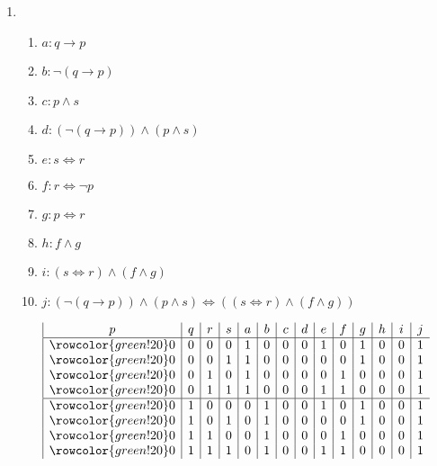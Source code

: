 \documentclass{article}
\begin{document}
\begin{enumerate}[label=(\alph*)]
\begin{enumerate}[label=\roman*.]
        \item 
        \begin{enumerate}[label={}]         
            \item $a: q\rightarrow{}p$         
            \item $b: \lnot{}(q\rightarrow{}p)$         
            \item $c: p\land{}s$         
            \item $d: (\lnot{}(q\rightarrow{}p))\land{}(p\land{}s)$       
            \item $e: s\Leftrightarrow{}r$          
            \item $f: r\Leftrightarrow{}\lnot{}p$         
            \item $g: p\Leftrightarrow{}r$   
            \item $h: f\land{}g$
            \item $i: (s\Leftrightarrow{}r)\land{}(f\land{}g)$         
            \item $j: (\lnot{}(q\rightarrow{}p))\land{}(p\land{}s)\Leftrightarrow{}((s\Leftrightarrow{}r)\land{}(f\land{}g))$
        \end{enumerate}
        \begin{displaymath}
            \begin{array}{|c|c|c|c|c|c|c|c|c|c|c|c|c|c}
               p & q & r & s & a & b & c & d & e & f & g & h & i & j \\
            \hline
            \rowcolor{green!20}
            0 & 0 & 0 & 0 & 1 & 0 & 0 & 0 & 1 & 0 & 1 & 0 & 0 & 1 \\
            \rowcolor{green!20}
            0 & 0 & 0 & 1 & 1 & 0 & 0 & 0 & 0 & 0 & 1 & 0 & 0 & 1 \\
            \rowcolor{green!20}
            0 & 0 & 1 & 0 & 1 & 0 & 0 & 0 & 0 & 1 & 0 & 0 & 0 & 1 \\
            \rowcolor{green!20}
            0 & 0 & 1 & 1 & 1 & 0 & 0 & 0 & 1 & 1 & 0 & 0 & 0 & 1 \\
            \hline
            \rowcolor{green!20}
            0 & 1 & 0 & 0 & 0 & 1 & 0 & 0 & 1 & 0 & 1 & 0 & 0 & 1 \\
            \rowcolor{green!20}
            0 & 1 & 0 & 1 & 0 & 1 & 0 & 0 & 0 & 0 & 1 & 0 & 0 & 1 \\
            \rowcolor{green!20}
            0 & 1 & 1 & 0 & 0 & 1 & 0 & 0 & 0 & 1 & 0 & 0 & 0 & 1 \\
            \rowcolor{green!20}
            0 & 1 & 1 & 1 & 0 & 1 & 0 & 0 & 1 & 1 & 0 & 0 & 0 & 1 \\

\end{array}
\end{displaymath}
\end{enumerate}
\end{enumerate}
\end{document}
